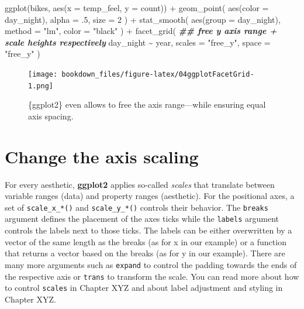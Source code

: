 \documentclass[
]{krantz}
\makeatletter
\newenvironment{Shaded}{\begin{snugshade}}{\end{snugshade}}
\newcommand{\AttributeTok}[1]{\textcolor[rgb]{0.61,0.61,0.61}{#1}}
\newcommand{\DecValTok}[1]{\textcolor[rgb]{0.06,0.06,0.06}{#1}}
\newcommand{\DocumentationTok}[1]{\textcolor[rgb]{0.37,0.37,0.37}{\textbf{\textit{#1}}}}
\newcommand{\FunctionTok}[1]{\textcolor[rgb]{0,0,0}{#1}}
\newcommand{\NormalTok}[1]{#1}
\newcommand{\SpecialCharTok}[1]{\textcolor[rgb]{0,0,0}{#1}}
\newcommand{\StringTok}[1]{\textcolor[rgb]{0.5,0.5,0.5}{#1}}
\newenvironment{kframe}{%
\medskip{}
\setlength{\fboxsep}{.8em}
 \def\at@end@of@kframe{}%
 \ifinner\ifhmode%
  \def\at@end@of@kframe{\end{minipage}}%
  \begin{minipage}{\columnwidth}%
 \fi\fi%
 \def\FrameCommand##1{\hskip\@totalleftmargin \hskip-\fboxsep
 \colorbox{shadecolor}{##1}\hskip-\fboxsep
     \hskip-\linewidth \hskip-\@totalleftmargin \hskip\columnwidth}%
 \MakeFramed {\advance\hsize-\width
   \@totalleftmargin\z@ \linewidth\hsize
   \@setminipage}}%
 {\par\unskip\endMakeFramed%
 \at@end@of@kframe}
\renewenvironment{Shaded}{\begin{kframe}}{\end{kframe}}
\makeatother
\begin{document}
\begin{Shaded}
\begin{Highlighting}[]
\FunctionTok{ggplot}\NormalTok{(bikes, }\FunctionTok{aes}\NormalTok{(}\AttributeTok{x =}\NormalTok{ temp\_feel, }\AttributeTok{y =}\NormalTok{ count)) }\SpecialCharTok{+} 
  \FunctionTok{geom\_point}\NormalTok{(}
    \FunctionTok{aes}\NormalTok{(}\AttributeTok{color =}\NormalTok{ day\_night), }\AttributeTok{alpha =}\NormalTok{ .}\DecValTok{5}\NormalTok{, }\AttributeTok{size =} \DecValTok{2}
\NormalTok{  ) }\SpecialCharTok{+} 
  \FunctionTok{stat\_smooth}\NormalTok{(}
    \FunctionTok{aes}\NormalTok{(}\AttributeTok{group =}\NormalTok{ day\_night), }\AttributeTok{method =} \StringTok{"lm"}\NormalTok{, }\AttributeTok{color =} \StringTok{"black"}
\NormalTok{  ) }\SpecialCharTok{+}
  \FunctionTok{facet\_grid}\NormalTok{(}
    \DocumentationTok{\#\# free y axis range + scale heights respectively}
\NormalTok{    day\_night }\SpecialCharTok{\textasciitilde{}}\NormalTok{ year, }\AttributeTok{scales =} \StringTok{"free\_y"}\NormalTok{, }\AttributeTok{space =} \StringTok{"free\_y"}
\NormalTok{  )}
\end{Highlighting}
\end{Shaded}

\begin{figure}
\centering
\texttt{[image: bookdown\_files/figure-latex/04ggplotFacetGrid-1.png]}
\caption{\label{fig:04ggplotFacetGrid}\{ggplot2\} even allows to free the axis range---while ensuring equal axis spacing.}
\end{figure}

\hypertarget{axis-scaling}{%
\section{Change the axis scaling}\label{axis-scaling}}

For every aesthetic, \textbf{ggplot2} applies so-called \emph{scales} that translate between variable ranges (data) and property ranges (aesthetic). For the positional axes, a set of \texttt{scale\_x\_*()} and \texttt{scale\_y\_*()} controls their behavior. The \texttt{breaks} argument defines the placement of the axes ticks while the \texttt{labels} argument controls the labels next to those ticks. The labels can be either overwritten by a vector of the same length as the breaks (as for x in our example) or a function that returns a vector based on the breaks (as for y in our example). There are many more arguments such as \texttt{expand} to control the padding towards the ends of the respective axis or \texttt{trans} to transform the scale. You can read more about how to control \texttt{scales} in Chapter XYZ and about label adjustment and styling in Chapter XYZ.
\end{document}

